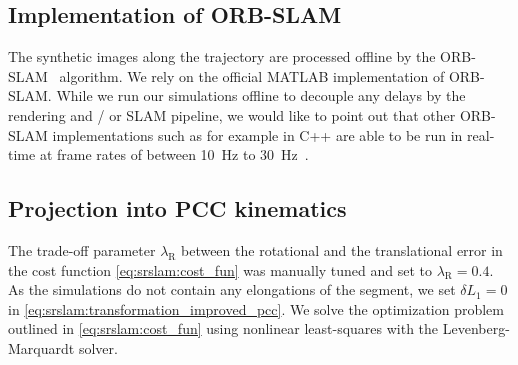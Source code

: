 \subsection{Implementation of ORB-SLAM}
The synthetic images along the trajectory are processed offline by the ORB-SLAM~\cite{mur2017orb} algorithm. We rely on the official MATLAB implementation of ORB-SLAM. While we run our simulations offline to decouple any delays by the rendering and / or \gls{SLAM} pipeline, we would like to point out that other ORB-SLAM implementations such as for example in C++ are able to be run in real-time at frame rates of between \SI{10}{Hz} to \SI{30}{Hz}~\cite{mur2017orb}.

\subsection{Projection into \gls{PCC} kinematics}
The trade-off parameter $\lambda_\mathrm{R}$ between the rotational and the translational error in the cost function \eqref{eq:srslam:cost_fun} was manually tuned and set to $\lambda_\mathrm{R}=0.4$.
As the simulations do not contain any elongations of the segment, we set $\delta L_1 = 0$ in \eqref{eq:srslam:transformation_improved_pcc}. 
We solve the optimization problem outlined in \eqref{eq:srslam:cost_fun} using nonlinear least-squares with the Levenberg-Marquardt solver. %

